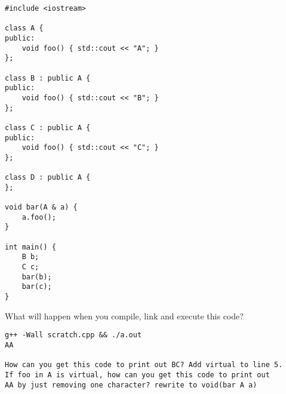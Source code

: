 \documentclass[landscape]{slides}
\begin{document}
\begin{slide}
\begin{lstlisting}
#include <iostream>

class A {
public:
    void foo() { std::cout << "A"; }
};

class B : public A {
public:
    void foo() { std::cout << "B"; }
};

class C : public A {
public:
    void foo() { std::cout << "C"; }
};

class D : public A {
};

void bar(A & a) {
    a.foo();
}

int main() {
    B b;
    C c;
    bar(b);
    bar(c);
}
\end{lstlisting}

What will happen when you compile, link and execute this code?

\begin{note}
\begin{tiny}
\begin{verbatim}
g++ -Wall scratch.cpp && ./a.out
AA

How can you get this code to print out BC? Add virtual to line 5.
If foo in A is virtual, how can you get this code to print out
AA by just removing one character? rewrite to void(bar A a)
\end{verbatim}
\end{tiny}
\end{note}

\end{slide}

\end{document}
